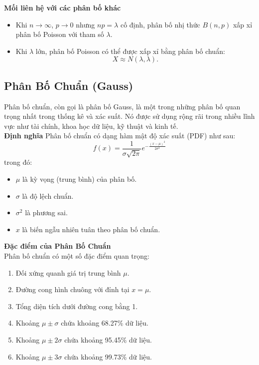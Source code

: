 \textbf{Mối liên hệ với các phân bố khác}
\begin{itemize}
    \item Khi $n \to \infty$, $p \to 0$ nhưng $np = \lambda$ cố định, phân bố nhị thức $B(n, p)$ xấp xỉ phân bố Poisson với tham số $\lambda$.
    \item Khi $\lambda$ lớn, phân bố Poisson có thể được xấp xỉ bằng phân bố chuẩn:
    \begin{equation}
    X \approx N(\lambda, \lambda).
    \end{equation}
\end{itemize}

\subsection{Phân Bố Chuẩn (Gauss)}

Phân bố chuẩn, còn gọi là phân bố Gauss, là một trong những phân bố quan trọng nhất trong thống kê và xác suất. Nó được sử dụng rộng rãi trong nhiều lĩnh vực như tài chính, khoa học dữ liệu, kỹ thuật và kinh tế.\\
\textbf{Định nghĩa}
Phân bố chuẩn có dạng hàm mật độ xác suất (PDF) như sau:
\begin{equation}
    f(x) = \frac{1}{\sigma \sqrt{2\pi}} e^{-\frac{(x - \mu)^2}{2\sigma^2}}
\end{equation}
trong đó:
\begin{itemize}
    \item $\mu$ là kỳ vọng (trung bình) của phân bố.
    \item $\sigma$ là độ lệch chuẩn.
    \item $\sigma^2$ là phương sai.
    \item $x$ là biến ngẫu nhiên tuân theo phân bố chuẩn.
\end{itemize}

\noindent \textbf{Đặc điểm của Phân Bố Chuẩn}\\
Phân bố chuẩn có một số đặc điểm quan trọng:
\begin{enumerate}
    \item Đối xứng quanh giá trị trung bình $\mu$.
    \item Đường cong hình chuông với đỉnh tại $x = \mu$.
    \item Tổng diện tích dưới đường cong bằng 1.
    \item Khoảng $\mu \pm \sigma$ chứa khoảng 68.27\% dữ liệu.
    \item Khoảng $\mu \pm 2\sigma$ chứa khoảng 95.45\% dữ liệu.
    \item Khoảng $\mu \pm 3\sigma$ chứa khoảng 99.73\% dữ liệu.
\end{enumerate}

